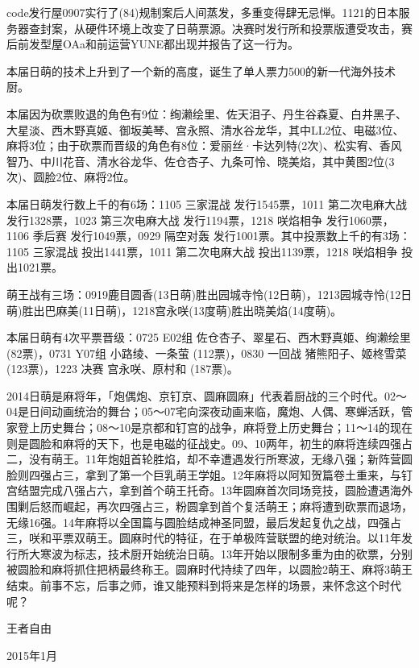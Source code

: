 code发行屋0907实行了(84)规制案后人间蒸发，多重变得肆无忌惮。1121的日本服务器查封案，从硬件环境上改变了日萌票源。决赛时发行所和投票版遭受攻击，赛后前发型屋OAa和前运营YUNE都出现并报告了这一行为。

本届日萌的技术上升到了一个新的高度，诞生了单人票力500的新一代海外技术厨。

本届因为砍票败退的角色有9位：绚濑绘里、佐天泪子、丹生谷森夏、白井黑子、大星淡、西木野真姬、御坂美琴、宫永照、清水谷龙华，其中LL2位、电磁3位、麻将3位；由于砍票而晋级的角色有8位：爱丽丝·卡达列特(2次)、松实宥、香风智乃、中川花音、清水谷龙华、佐仓杏子、九条可怜、晓美焰，其中黄图2位(3次)、圆脸2位、麻将2位。

本届日萌发行数上千的有6场：1105 三家混战 发行1545票，1011 第二次电麻大战 发行1328票，1023 第三次电麻大战 发行1194票，1218 咲焰相争 发行1060票，1106 季后赛 发行1049票，0929 隔空对轰 发行1001票。其中投票数上千的有3场：1105 三家混战 投出1441票，1011 第二次电麻大战 投出1139票，1218 咲焰相争 投出1021票。

萌王战有三场：0919鹿目圆香(13日萌)胜出园城寺怜(12日萌)，1213园城寺怜(12日萌)胜出巴麻美(11日萌)，1218宫永咲(13度萌)胜出晓美焰(14度萌)。

本届日萌有4次平票晋级：0725 E02组 佐仓杏子、翠星石、西木野真姬、绚濑绘里 (82票)，0731 Y07组 小路绫、一条萤 (112票)，0830 一回战 猪熊阳子、姬柊雪菜 (123票)，1223 决赛 宫永咲、原村和 (187票)。

2014日萌是麻将年，「炮偶炮、京钉京、圆麻圆麻」代表着厨战的三个时代。02～04是日间动画统治的舞台；05～07宅向深夜动画来临，魔炮、人偶、寒蝉活跃，管家登上历史舞台；08～10是京都和钉宫的战争，麻将登上历史舞台；11～14的现在则是圆脸和麻将的天下，也是电磁的征战史。09、10两年，初生的麻将连续四强占二，没有萌王。11年炮姐首轮胜焰，却不幸遭遇发行所寒波，无缘八强；新阵营圆脸则四强占三，拿到了第一个巨乳萌王学姐。12年麻将以阿知贺篇卷土重来，与钉宫结盟完成八强占六，拿到首个萌王托奇。13年圆麻首次同场竞技，圆脸遭遇海外围剿后怒而崛起，再次四强占三，粉圆拿到首个复活萌王；麻将遭到砍票而退场，无缘16强。14年麻将以全国篇与圆脸结成神圣同盟，最后发起复仇之战，四强占三，咲和平票双萌王。圆麻时代的特征，在于单极阵营联盟的绝对统治。以11年发行所大寒波为标志，技术厨开始统治日萌。13年开始以限制多重为由的砍票，分别被圆脸和麻将抓住把柄最终称王。圆麻时代持续了四年，以圆脸2萌王、麻将3萌王结束。前事不忘，后事之师，谁又能预料到将来是怎样的场景，来怀念这个时代呢？

\begin{flushright}
  \rm\kasho 王者自由

  \kai 2015年1月
\end{flushright}

